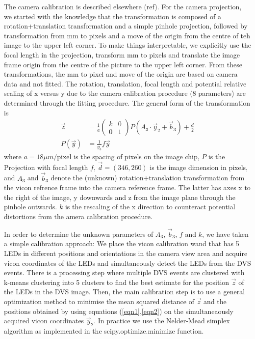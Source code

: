 \documentclass{article}
\begin{document}
The camera calibration is described elsewhere (ref).
For the camera projection, we started with the knowledge that the
transformation is composed of a rotation+translation transformation and a simple pinhole projection, followed by transformation from mm to pixels and a move of the origin from the centre of teh image to the upper left corner. To make things interpretable, we explicitly use the focal length in the projection, transform mm to pixels and translate the image frame origin from the centre of the picture to the upper left corner. From these transformations, the mm to pixel and move of the origin are based on camera data and not fitted. The rotation, translation, focal length and potential relative scaling of x versus y due to the camera calibration procedure (8 parameters) are determined through the fitting procedure.
The general form of the transformation is
\begin{align}
  \vec{z} &= \frac{1}{a} \left(\begin{array}{cc} k & 0 \\ 0 & 1 \end{array}\right) P(A_3\cdot \vec{y}_2 + \vec{b}_3) + \frac{d}{2} \\
  P(\vec{y}) &= \frac{1}{y_3}f \vec{y}  
\end{align}
where $a= 18 \mu m/\text{pixel}$ is the spacing of pixels on the image chip, $P$ is the Projection with focal length $f$, $\vec{d}= (346, 260)$ is the image dimension in pixels, and $A_3$ and $\vec{b}_3$ denote the (unknown) rotation+translation transformation from the vicon refrence frame into the camera reference frame. The latter has axes x to the right of the image, y downwards and z from the image plane through the pinhole outwards. $k$ is the rescaling of the x direction to counteract potential distortions from the amera calibration procedure.

In order to determine the unknown parameters of $A_3$, $\vec{b}_3$, $f$ and $k$, we have taken a simple calibration approach: We place the vicon calibration wand that has 5 LEDs in different positions and orientations in the camera view area and acquire vicon coordinates of the LEDs and simultaneously detect the LEDs from the DVS events. There is a processing step where multiple DVS events are clustered with k-means clustering into 5 clusters to find the best estimate for the position $\vec{z}$ of the LEDs in the DVS image. Then, the main calibration step is to use a general optimization method to minimise the mean squared distance of $\vec{z}$ and the positions obtained by using equations (\ref{eqn1},\ref{eqn2}) on the simultaneaously acquired vicon coordinates $\vec{y}_2$. In practice we use the Nelder-Mead simplex algorithm as implemented in the scipy.optimize.minimize function.
\end{document}
